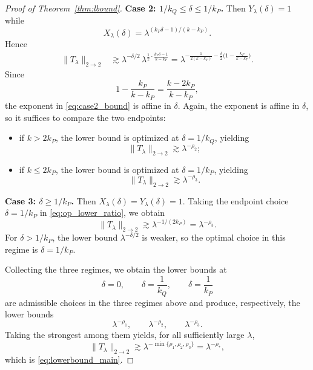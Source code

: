 \documentclass[10pt]{amsart}
\numberwithin{equation}{section}
\theoremstyle{definition}
\theoremstyle{remark}
\theoremstyle{remark}
\begin{document}
\begin{proof}[Proof of Theorem~\ref{thm:lbound}]
		\smallskip
		\noindent\textbf{Case 2: $1/k_Q\le \delta\le 1/k_P$.}
		Then $Y_\lambda(\delta)=1$ while
		\[
		X_\lambda(\delta)=\lambda^{(k_P\delta-1)/(k-k_P)}.
		\]
		Hence
		\begin{align}
			\|T_\lambda\|_{2\to2}
			&\gtrsim \lambda^{-\delta/2}\,\lambda^{\frac12\cdot\frac{k_P\delta-1}{k-k_P}}
			=\lambda^{-\frac1{2(k-k_P)}-\frac{\delta}{2}\bigl(1-\frac{k_P}{k-k_P}\bigr)}.\label{eq:case2_bound}
		\end{align}
		Since
		\[
		1-\frac{k_P}{k-k_P}=\frac{k-2k_P}{k-k_P},
		\]
		the exponent in \eqref{eq:case2_bound} is affine in $\delta$. Again,
        the exponent is affine in $\delta$,
        so it suffices to compare the two endpoints:
		\begin{itemize}
			\item if $k>2k_P$, the lower bound is optimized at $\delta=1/k_Q$, yielding
			\[
			\|T_\lambda\|_{2\to2}\gtrsim \lambda^{-\rho_2};
			\]
			\item if $k\le 2k_P$, the lower bound is optimized at $\delta=1/k_P$, yielding
			\[
			\|T_\lambda\|_{2\to2}\gtrsim \lambda^{-\rho_3}.
			\]
		\end{itemize}
		
		\smallskip
		\noindent\textbf{Case 3: $\delta\ge 1/k_P$.}
		Then $X_\lambda(\delta)=Y_\lambda(\delta)=1$.
			Taking the endpoint choice $\delta=1/k_P$ in \eqref{eq:op_lower_ratio}, we obtain
			\[
			\|T_\lambda\|_{2\to2}
			\gtrsim
			\lambda^{-1/(2k_P)}
			=
			\lambda^{-\rho_3}.
			\]
			For $\delta>1/k_P$, the lower bound $\lambda^{-\delta/2}$ is weaker, so the optimal choice in this regime is
			$\delta=1/k_P$.
		
		
	
			Collecting the three regimes,
we obtain the lower bounds at
			\[
			\delta=0,\qquad \delta=\frac1{k_Q},\qquad \delta=\frac1{k_P}
			\]
			are admissible choices in the three regimes above and produce, respectively, the lower bounds
			\[
			\lambda^{-\rho_1},\qquad
			\lambda^{-\rho_2},\qquad
			\lambda^{-\rho_3}.
			\]
			Taking the strongest among them yields, for all sufficiently large $\lambda$,
		\[
		\|T_\lambda\|_{2\to2}
		\gtrsim \lambda^{-\min\{\rho_1,\rho_2,\rho_3\}}
		=\lambda^{-\rho_*},
		\]
		which is \eqref{eq:lowerbound_main}.
	\end{proof}
	
	
	
	
	
	
	
	
	
	
	
\end{document}
